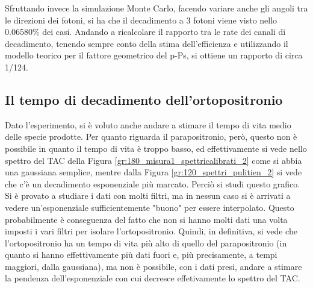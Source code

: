 Sfruttando invece la simulazione Monte Carlo, facendo variare anche gli angoli tra le direzioni dei fotoni, si ha che il decadimento a 3 fotoni viene visto nello 0.06580\% dei casi. Andando a ricalcolare il rapporto tra le rate dei canali di decadimento, tenendo sempre conto della stima dell'efficienza e utilizzando il modello teorico per il fattore geometrico del p-Ps, si ottiene un rapporto di circa 1/124.

\FloatBarrier
\subsection{Il tempo di decadimento dell'ortopositronio}
Dato l'esperimento, si è voluto anche andare a stimare il tempo di vita medio delle specie prodotte. Per quanto riguarda il parapositronio, però, questo non è
possibile in quanto il tempo di vita è troppo basso, ed effettivamente si vede nello spettro del TAC della Figura \ref{gr:180_misura1_spettricalibrati_2} come si
abbia una gaussiana semplice, mentre dalla Figura \ref{gr:120_spettri_pulitien_2} si vede che c'è un decadimento esponenziale più marcato. Perciò si studi questo
grafico.\\

Si è provato a studiare i dati con molti filtri, ma in nessun caso si è arrivati a vedere un'esponenziale sufficientemente "buono" per essere interpolato. Questo
probabilmente è conseguenza del fatto che non si hanno molti dati una volta imposti i vari filtri per isolare l'ortopositronio. Quindi, in definitiva, si vede che
l'ortopositronio ha un tempo di vita più alto di quello del parapositronio (in quanto si hanno effettivamente più dati fuori e, più precisamente, a tempi maggiori, dalla
gaussiana), ma non è possibile, con i dati presi, andare a stimare la pendenza dell'esponenziale con cui decresce effetivamente lo spettro del TAC.


